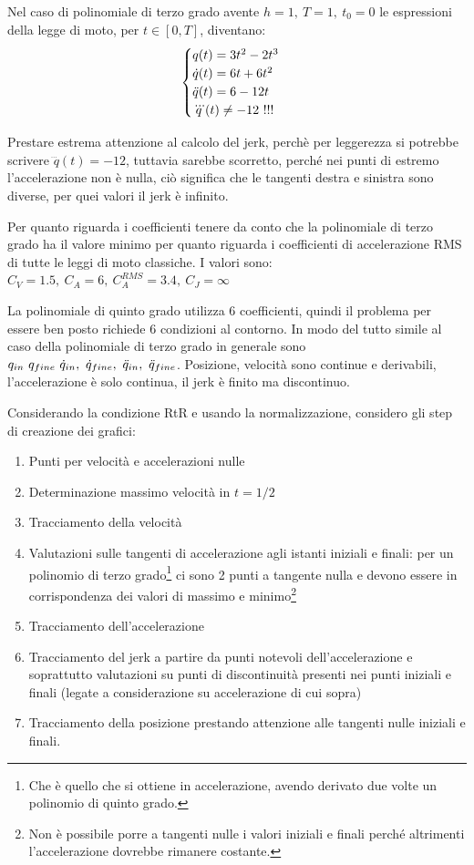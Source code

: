 Nel caso di polinomiale di terzo grado avente \(h=1, \ T=1, \ t_0=0\) le espressioni della legge di moto, per \(t\in[0,T]\), diventano:
\[\begin{cases}
    q(t) = 3 t^2 - 2 t^3 \\
    \dot{q}(t) = 6 t + 6 t^2 \\
    \Ddot{q}(t) = 6 - 12 t \\
    \dddot{q}(t) \neq -12 \ !!!
\end{cases}\]

Prestare estrema attenzione al calcolo del jerk, perchè per leggerezza si potrebbe scrivere \(\dddot{q}(t) = -12\), tuttavia sarebbe scorretto, perché nei punti di estremo l'accelerazione non è nulla, ciò significa che le tangenti destra e sinistra sono diverse, per quei valori il jerk è infinito.

Per quanto riguarda i coefficienti tenere da conto che la polinomiale di terzo grado ha il valore minimo per quanto riguarda i coefficienti di accelerazione RMS di tutte le leggi di moto classiche. I valori sono: \(C_V=1.5, \ C_A = 6, \ C_A^{RMS}=3.4, \ C_J = \infty\)


La polinomiale di quinto grado utilizza 6 coefficienti, quindi il problema per essere ben posto richiede 6 condizioni al contorno. In modo del tutto simile al caso della polinomiale di terzo grado in generale sono \(q_{in} \ q_{fine} \ \dot{q}_{in}, \ \dot{q}_{fine}, \ \Ddot{q}_{in}, \ \Ddot{q}_{fine}\).
Posizione, velocità sono continue e derivabili, l'accelerazione è solo continua, il jerk è finito ma discontinuo.

Considerando la condizione RtR e usando la normalizzazione, considero gli step di creazione dei grafici:
\begin{enumerate}
    \item Punti per velocità e accelerazioni nulle
    \item Determinazione massimo velocità in \(t=1/2\)
    \item Tracciamento della velocità
    \item Valutazioni sulle tangenti di accelerazione agli istanti iniziali e finali: per un polinomio di terzo grado\footnote{Che è quello che si ottiene in accelerazione, avendo derivato due volte un polinomio di quinto grado.} ci sono 2 punti a tangente nulla e devono essere in corrispondenza dei valori di massimo e minimo\footnote{Non è possibile porre a tangenti nulle i valori iniziali e finali perché altrimenti l'accelerazione dovrebbe rimanere costante.}
    \item Tracciamento dell'accelerazione
    \item Tracciamento del jerk a partire da punti notevoli dell'accelerazione e soprattutto valutazioni su punti di discontinuità presenti nei punti iniziali e finali (legate a considerazione su accelerazione di cui sopra)
    \item Tracciamento della posizione prestando attenzione alle tangenti nulle iniziali e finali.
\end{enumerate}

